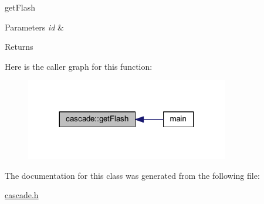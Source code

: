 get\+Flash 


\begin{DoxyParams}{Parameters}
{\em id} & \\
\hline
\end{DoxyParams}
\begin{DoxyReturn}{Returns}

\end{DoxyReturn}
Here is the caller graph for this function\+:\nopagebreak
\begin{figure}[H]
\begin{center}
\leavevmode
\includegraphics[width=251pt]{classcascade_a1608f0fc7e55bd87b4fc1a109ded71fa_icgraph}
\end{center}
\end{figure}


The documentation for this class was generated from the following file\+:\begin{DoxyCompactItemize}
\item 
\mbox{\hyperlink{cascade_8h}{cascade.\+h}}\end{DoxyCompactItemize}
